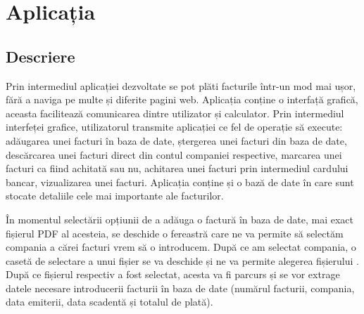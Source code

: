 \documentclass[12pt]{book}
\begin{document}
\chapter{Aplicația}
\section{Descriere}

Prin intermediul aplicației dezvoltate se pot plăti facturile într-un mod mai ușor, fără a naviga pe multe și diferite pagini web. Aplicația conține o interfață grafică, aceasta facilitează comunicarea dintre utilizator și calculator. Prin intermediul interfeței grafice, utilizatorul transmite aplicației ce fel de operație să execute: adăugarea unei facturi în baza de date, ștergerea unei facturi din baza de date, descărcarea unei facturi direct din contul companiei respective, marcarea unei facturi ca fiind achitată sau nu, achitarea unei facturi prin intermediul cardului bancar, vizualizarea unei facturi. Aplicația conține și o bază de date în care sunt stocate detaliile cele mai importante ale facturilor.

În momentul selectării opțiunii de a adăuga o factură în baza de date, mai exact fișierul PDF al acesteia, se deschide o fereastră care ne va permite să selectăm compania a cărei facturi vrem să o introducem. După ce am selectat compania, o casetă de selectare a unui fișier se va deschide și ne va permite alegerea fișierului . După ce fișierul respectiv a fost selectat, acesta va fi parcurs și se vor extrage datele necesare introducerii facturii în baza de date (numărul facturii, compania, data emiterii, data scadentă și totalul de plată). 
\end{document}
